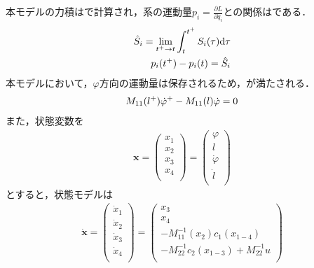           本モデルの力積はで計算され，系の運動量$p_i = \frac{\partial L}{\partial \dot{q}_i}$との関係はである．
          \begin{eqnarray}
            \equlabel{Si}
            \hat{S}_i = \lim_{t^{+}\to t} \int_{t}^{t^{+}} S_i (\tau) \mathrm{d}\tau\\
            \equlabel{pi}
            p_i(t^{+})-p_i(t)=\hat{S}_i
            \end{eqnarray}
          本モデルにおいて，$\varphi$方向の運動量は保存されるため，が満たされる．
          \begin{eqnarray}
            \equlabel{impulse}
            M_{11}(l^{+})\dot{\varphi}^{+}-M_{11}(l)\dot{\varphi}=0
            \end{eqnarray}
          また，状態変数を
          \begin{eqnarray}
            \bm{x}=
            \begin{pmatrix}
              x_1\\
              x_2\\
              x_3\\
              x_4\\
              \end{pmatrix}
              =
              \begin{pmatrix}
                \varphi\\
                l\\
                \dot{\varphi}\\
                \dot{l}\\
                \end{pmatrix}
            \end{eqnarray}
          とすると，状態モデルは
          \begin{eqnarray}
            \dot{\bm{x}}=
            \begin{pmatrix}
              \dot{x}_1\\
              \dot{x}_2\\
              \dot{x}_3\\
              \dot{x}_4\\
              \end{pmatrix}
              =
              \begin{pmatrix}
                x_3\\
                x_4\\
                -M_{11}^{-1}(x_2)c_1(x_{1-4})\\
                -M_{22}^{-1}c_2(x_{1-3})+M_{22}^{-1}u\\
                \end{pmatrix}
            \end{eqnarray}

